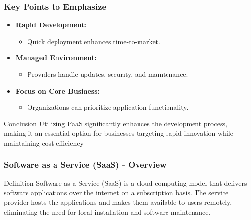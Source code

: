 \documentclass[aspectratio=169]{beamer}
\begin{document}
\begin{frame}[fragile]
    \frametitle{Key Points to Emphasize}

    \begin{itemize}
        \item \textbf{Rapid Development:} 
        \begin{itemize}
            \item Quick deployment enhances time-to-market.
        \end{itemize}
        
        \item \textbf{Managed Environment:} 
        \begin{itemize}
            \item Providers handle updates, security, and maintenance.
        \end{itemize}
        
        \item \textbf{Focus on Core Business:} 
        \begin{itemize}
            \item Organizations can prioritize application functionality.
        \end{itemize}
    \end{itemize}
    
    \begin{block}{Conclusion}
        Utilizing PaaS significantly enhances the development process, making it an essential option for businesses targeting rapid innovation while maintaining cost efficiency.
    \end{block}
\end{frame}

\begin{frame}[fragile]
    \frametitle{Software as a Service (SaaS) - Overview}
    
    \begin{block}{Definition}
        Software as a Service (SaaS) is a cloud computing model that delivers software applications over the internet on a subscription basis. The service provider hosts the applications and makes them available to users remotely, eliminating the need for local installation and software maintenance.
    \end{block}
\end{frame}
\end{document}
